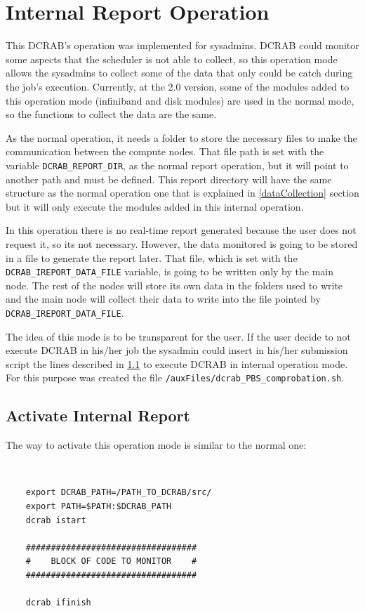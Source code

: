\documentclass[10pt,a4paper]{report}
\begin{document}
\chapter{Internal Report Operation}
\label{internalReportChapter}
This DCRAB's operation was implemented for sysadmins. DCRAB could monitor some aspects that the scheduler is not able to collect, so this operation mode allows the sysadmins to collect some of the data that only could be catch during the job's execution. Currently, at the 2.0 version, some of the modules added to this operation mode (infiniband and disk modules) are used in the normal mode, so the functions to collect the data are the same.

As the normal operation, it needs a folder to store the necessary files to make the communication between the compute nodes. That file path is set with the variable \verb+DCRAB_REPORT_DIR+, as the normal report operation, but it will point to another path and must be defined. This report directory will have the same structure as the normal operation one that is explained in \ref{dataCollection} section but it will only execute the modules added in this internal operation.

In this operation there is no real-time report generated because the user does not request it, so its not necessary. However, the data monitored is going to be stored in a file to generate the report later. That file, which is set with the \verb+DCRAB_IREPORT_DATA_FILE+ variable, is going to be written only by the main node. The rest of the nodes will store its own data in the folders used to write and the main node will collect their data to write into the file pointed by \verb+DCRAB_IREPORT_DATA_FILE+.

The idea of this mode is to be transparent for the user. If the user decide to not execute DCRAB in his/her job the sysadmin could insert in his/her submission script the lines described in \ref{internalReport} to execute DCRAB in internal operation mode. For this purpose was created the file \texttt{/auxFiles/dcrab\_PBS\_comprobation.sh}.

\section{Activate Internal Report}
\label{internalReport}
The way to activate this operation mode is similar to the normal one:

\ \

\begin{verbatim}
    export DCRAB_PATH=/PATH_TO_DCRAB/src/
    export PATH=$PATH:$DCRAB_PATH
    dcrab istart

    ##################################
    #    BLOCK OF CODE TO MONITOR    #
    ##################################

    dcrab ifinish
\end{verbatim}
\end{document}
